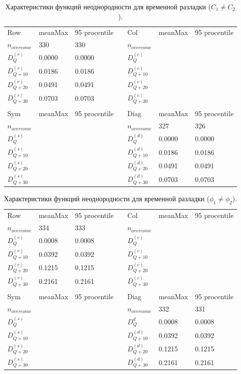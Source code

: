 \documentclass[specialist, substylefile = spbu.rtx,
			   subf, href, 12pt]{disser}
\begin{document}
\begin{table}[!hhh]
	\caption{Характеристики функций неоднородности для временной разладки ($ C_1 \neq C_2 $).}
	\begin{tabular}{lllllll}
		Row & meanMax & 95 procentile &  & Col & meanMax & 95 procentile \\
		$n_{overcome}$ & 330 & 330 &  & $n_{overcome}$ &  &  \\
		$D_Q^{(r)}$ & 0.0000 & 0.0000 &  & $D_Q^{(c)}$ &  &  \\
		$D_{Q+10}^{(r)}$ & 0.0186 & 0.0186 &  & $D_{Q+10}^{(c)}$ &  &  \\
		$D_{Q+20}^{(r)}$ & 0.0491 & 0.0491 &  & $D_{Q+20}^{(c)}$ &  &  \\
		$D_{Q+30}^{(r)}$ & 0.0703 & 0.0703 &  & $D_{Q+30}^{(c)}$ &  &  \\
		&  &  &  &  &  &  \\
		Sym & meanMax & 95 procentile &  & Diag & meanMax & 95 procentile \\
		$n_{overcome}$ &  &  &  & $n_{overcome}$ & 327 & 326 \\
		$D_Q^{(s)}$ &  &  &  & $D_Q^{(d)}$ & 0.0000 & 0.0000 \\
		$D_{Q+10}^{(s)}$ &  &  &  & $D_{Q+10}^{(d)}$ & 0.0186 & 0.0186 \\
		$D_{Q+20}^{(s)}$ &  &  &  & $D_{Q+20}^{(d)}$ & 0.0491 & 0.0491 \\
		$D_{Q+30}^{(s)}$ &  &  &  & $D_{Q+30}^{(d)}$ & 0.0703 & 0.0703
	\end{tabular}
	\label{tab:TemporaryHeterogeneityAmplitude}
\end{table}

\newpage
\begin{table}[!hhh]
	\caption{Характеристики функций неоднородности для временной разладки ($\phi_1 \neq \phi_2$).}
	\begin{tabular}{lllllll}
		Row & meanMax & 95 procentile &  & Col & meanMax & 95 procentile \\
		$n_{overcome}$ & 334 & 333 &  & $n_{overcome}$ &  &  \\
		$D_Q^{(r)}$ & 0.0008 & 0.0008 &  & $D_Q^{(c)}$ &  &  \\
		$D_{Q+10}^{(r)}$ & 0.0392 & 0.0392 &  & $D_{Q+10}^{(c)}$ &  &  \\
		$D_{Q+20}^{(r)}$ & 0.1215 & 0.1215 &  & $D_{Q+20}^{(c)}$ &  &  \\
		$D_{Q+30}^{(r)}$ & 0.2161 & 0.2161 &  & $D_{Q+30}^{(c)}$ &  &  \\
		&  &  &  &  &  &  \\
		Sym & meanMax & 95 procentile &  & Diag & meanMax & 95 procentile \\
		$n_{overcome}$ &  &  &  & $n_{overcome}$ & 332 & 331 \\
		$D_Q^{(s)}$ &  &  &  & $D_Q^d$ & 0.0008 & 0.0008 \\
		$D_{Q+10}^{(s)}$ &  &  &  & $D_{Q+10}^{(d)}$ & 0.0392 & 0.0392 \\
		$D_{Q+20}^{(s)}$ &  &  &  & $D_{Q+20}^{(d)}$ & 0.1215 & 0.1215 \\
		$D_{Q+30}^{(s)}$ &  &  &  & $D_{Q+30}^{(d)}$ & 0.2161 & 0.2161
	\end{tabular}
	\label{tab:TemporaryHeterogeneityShifted}
\end{table}
\end{document}
